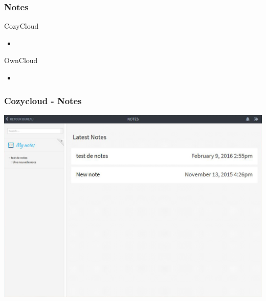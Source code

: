 \documentclass{beamer}
\begin{document}
\begin{frame}
\frametitle{Notes}

\begin{block}{CozyCloud}
\begin{itemize}
\item 
\end{itemize}
\end{block}

\begin{block}{OwnCloud}
\begin{itemize}
\item 
\end{itemize}
\end{block}
\end{frame}


\begin{frame}
\frametitle{Cozycloud - Notes}
\includegraphics[scale=0.3] {./CozyCloud/CozyCloud_Notes.jpg}
\end{frame}
\end{document}
